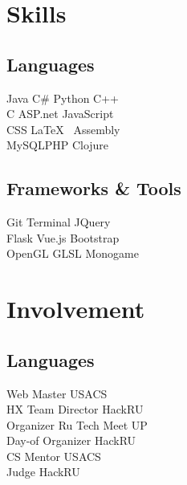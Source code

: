 \documentclass[]{deedy-resume-openfont}
\begin{document}
\begin{minipage}[t]{0.33\textwidth}

\section{Skills}
\subsection{Languages}
Java \textbullet{} C\# \textbullet{} Python \textbullet{} C++ \\
C\textbullet{} ASP.net \textbullet{} JavaScript \\ 
CSS \textbullet{} \LaTeX\ \textbullet{} Assembly \\
MySQL\textbullet{}PHP \textbullet{}Clojure\\
\sectionsep
\sectionsep
\subsection{Frameworks \& Tools}
Git \textbullet{}  Terminal \textbullet{} JQuery\\
Flask\textbullet{} Vue.js\textbullet{} Bootstrap \\ 
OpenGL \textbullet{} GLSL \textbullet{} Monogame
\sectionsep


\section{Involvement} 
\subsection{Languages}
Web Master \textbullet{} USACS \\ 
HX Team Director \textbullet{} HackRU \\
Organizer \textbullet{} Ru Tech Meet UP \\ 
Day-of Organizer \textbullet{} HackRU \\
CS Mentor \textbullet{} USACS \\  
Judge \textbullet{} HackRU 
\sectionsep


%
%

\end{minipage} 
\hfill
\end{document}
